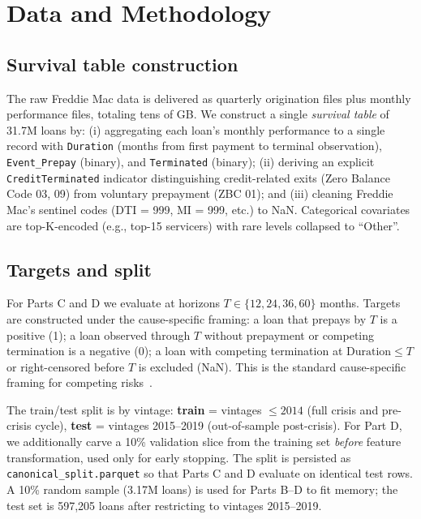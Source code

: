 \documentclass[11pt,a4paper]{article}
\begin{document}
\section{Data and Methodology}

\subsection{Survival table construction}

The raw Freddie Mac data is delivered as quarterly origination files plus monthly performance files, totaling tens of GB. We construct a single \emph{survival table} of 31.7M loans by:
(i) aggregating each loan's monthly performance to a single record with \texttt{Duration} (months from first payment to terminal observation), \texttt{Event\_Prepay} (binary), and \texttt{Terminated} (binary);
(ii) deriving an explicit \texttt{CreditTerminated} indicator distinguishing credit-related exits (Zero Balance Code 03, 09) from voluntary prepayment (ZBC 01); and
(iii) cleaning Freddie Mac's sentinel codes (DTI = 999, MI = 999, etc.) to NaN.
Categorical covariates are top-K-encoded (e.g., top-15 servicers) with rare levels collapsed to ``Other''.

\subsection{Targets and split}

For Parts C and D we evaluate at horizons $T \in \{12, 24, 36, 60\}$ months. Targets are constructed under the cause-specific framing: a loan that prepays by $T$ is a positive (1); a loan observed through $T$ without prepayment or competing termination is a negative (0); a loan with competing termination at $\text{Duration} \leq T$ or right-censored before $T$ is excluded (NaN). This is the standard cause-specific framing for competing risks~\cite{kalbfleischprentice}.

The train/test split is by vintage: \textbf{train} = vintages $\leq 2014$ (full crisis and pre-crisis cycle), \textbf{test} = vintages 2015--2019 (out-of-sample post-crisis). For Part D, we additionally carve a 10\% validation slice from the training set \emph{before} feature transformation, used only for early stopping. The split is persisted as \texttt{canonical\_split.parquet} so that Parts C and D evaluate on identical test rows. A 10\% random sample (3.17M loans) is used for Parts B--D to fit memory; the test set is 597{,}205 loans after restricting to vintages 2015--2019.
\end{document}

